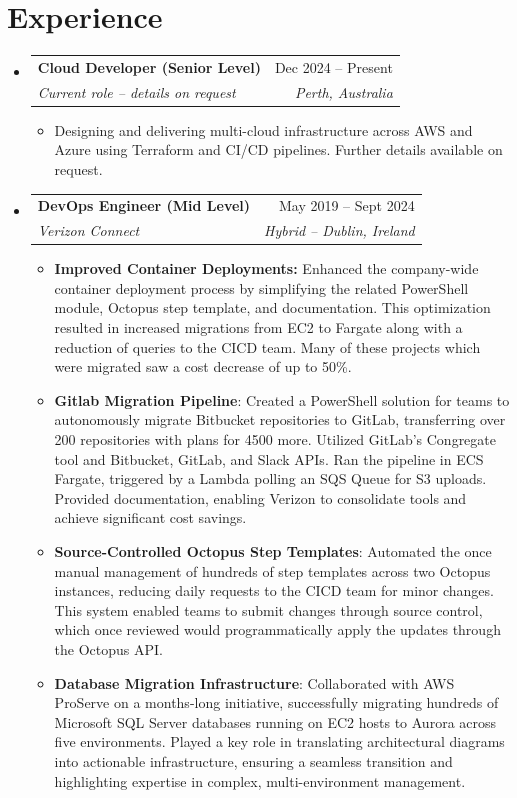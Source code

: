 \documentclass[a4paper,11pt]{article}
\makeatletter
\newcommand{\resumeItem}[1]{
  \item\small{#1}
}
\newcommand{\resumeItemListStart}{\begin{itemize}[rightmargin=0.11in]}
\newcommand{\resumeItemListEnd}{\end{itemize}}
\newcommand{\resumeQuadHeading}[4]{
  \item
  \begin{tabular*}{0.96\textwidth}[t]{l@{\extracolsep{\fill}}r}
    \textbf{#1} & #2 \\
    \textit{\small#3} & \textit{\small #4} \\
  \end{tabular*}
}
\newcommand{\resumeHeadingListStart}{
  \begin{itemize}[leftmargin=0.15in, label={}]
}
\newcommand{\resumeHeadingListEnd}{\end{itemize}}
\makeatother
\begin{document}

\section{Experience}
\resumeHeadingListStart{}
  \resumeQuadHeading{Cloud Developer (Senior Level)}{Dec 2024 -- Present}
  {Current role -- details on request}{Perth, Australia}
    \resumeItemListStart{}
      \resumeItem{Designing and delivering multi-cloud infrastructure across AWS and Azure using Terraform and CI/CD pipelines. Further details available on request.}
    \resumeItemListEnd{}

  \resumeQuadHeading{DevOps Engineer (Mid Level)}{May 2019 -- Sept 2024}
  {Verizon Connect}{Hybrid -- Dublin, Ireland}
    \resumeItemListStart{}
      \resumeItem{\textbf{Improved Container Deployments:} Enhanced the company-wide container deployment process by simplifying the related PowerShell module, Octopus step template, and documentation. This optimization resulted in increased migrations from EC2 to Fargate along with a reduction of queries to the CICD team. Many of these projects which were migrated saw a cost decrease of up to 50\%.}
      \resumeItem{\textbf{Gitlab Migration Pipeline}: Created a PowerShell solution for teams to autonomously migrate Bitbucket repositories to GitLab, transferring over 200 repositories with plans for 4500 more. Utilized GitLab's Congregate tool and Bitbucket, GitLab, and Slack APIs. Ran the pipeline in ECS Fargate, triggered by a Lambda polling an SQS Queue for S3 uploads. Provided documentation, enabling Verizon to consolidate tools and achieve significant cost savings.}
      \resumeItem{\textbf{Source-Controlled Octopus Step Templates}: Automated the once manual management of hundreds of step templates across two Octopus instances, reducing daily requests to the CICD team for minor changes. This system enabled teams to submit changes through source control, which once reviewed would programmatically apply the updates through the Octopus API.}
      \resumeItem{\textbf{Database Migration Infrastructure}: Collaborated with AWS ProServe on a months-long initiative, successfully migrating hundreds of Microsoft SQL Server databases running on EC2 hosts to Aurora across five environments. Played a key role in translating architectural diagrams into actionable infrastructure, ensuring a seamless transition and highlighting expertise in complex, multi-environment management.}
    \resumeItemListEnd{}
\resumeHeadingListEnd{}
\end{document}
